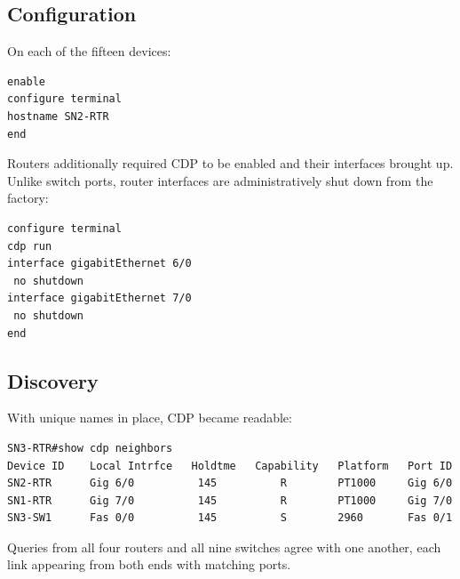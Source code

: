 \documentclass[12pt,a4paper]{article}
\begin{document}
\subsection{Configuration}

On each of the fifteen devices:

\begin{lstlisting}
enable
configure terminal
hostname SN2-RTR
end
\end{lstlisting}

Routers additionally required CDP to be enabled and their interfaces brought up.
Unlike switch ports, router interfaces are administratively shut down from the
factory:

\begin{lstlisting}
configure terminal
cdp run
interface gigabitEthernet 6/0
 no shutdown
interface gigabitEthernet 7/0
 no shutdown
end
\end{lstlisting}

\subsection{Discovery}

With unique names in place, CDP became readable:

\begin{lstlisting}
SN3-RTR#show cdp neighbors
Device ID    Local Intrfce   Holdtme   Capability   Platform   Port ID
SN2-RTR      Gig 6/0          145          R        PT1000     Gig 6/0
SN1-RTR      Gig 7/0          145          R        PT1000     Gig 7/0
SN3-SW1      Fas 0/0          145          S        2960       Fas 0/1
\end{lstlisting}

Queries from all four routers and all nine switches agree with one another, each
link appearing from both ends with matching ports.
\end{document}
